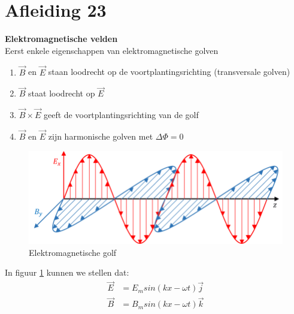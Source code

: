 \documentclass[a4paper,kul]{kulakarticle} %
\begin{document}
\section{Afleiding 23}
\textbf{Elektromagnetische velden}\\
Eerst enkele eigenschappen van elektromagnetische golven
\begin{enumerate}
	\item $\vec{B}$ en $\vec{E}$ staan loodrecht op de voortplantingsrichting (transversale golven)
	\item $\vec{B}$ staat loodrecht op $\vec{E}$
	\item $\vec{B} \times\vec{E}$ geeft de voortplantingsrichting van de golf
	\item $\vec{B}$ en $\vec{E}$ zijn harmonische golven met $\Delta\Phi = 0$
\end{enumerate}
\begin{figure}[h]
	\centering
	\includegraphics[width=0.7\linewidth]{An-electromagnetic-wave}
	\caption[Elektromagnetische golf]{Elektromagnetische golf}
	\label{fig:an-electromagnetic-wave}
\end{figure}
In figuur \ref{fig:an-electromagnetic-wave} kunnen we stellen dat:
\begin{align*}
	\vec{E} &= E_msin(kx-\omega t)\vec{j}\\
	\vec{B} &= B_msin(kx-\omega t)\vec{k}
\end{align*}
\newpage
\end{document}
